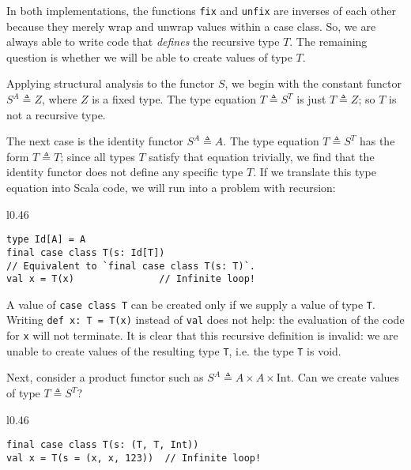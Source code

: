 In both implementations, the functions \lstinline!fix! and \lstinline!unfix!
are inverses of each other because they merely wrap and unwrap values
within a case class. So, we are always able to write code that \emph{defines}
the recursive type $T$. The remaining question is whether we will
be able to create values of type $T$.

Applying structural analysis to the functor $S$, we begin with the
constant functor $S^{A}\triangleq Z$, where $Z$ is a fixed type.
The type equation $T\triangleq S^{T}$ is just $T\triangleq Z$; so
$T$ is not a recursive type.

The next case is the identity functor $S^{A}\triangleq A$. The type
equation $T\triangleq S^{T}$ has the form $T\triangleq T$; since
all types $T$ satisfy that equation trivially, we find that the identity
functor does not define any specific type $T$. If we translate this
type equation into Scala code, we will run into a problem with recursion:

\begin{wrapfigure}{l}{0.46\columnwidth}%
\vspace{-1\baselineskip}
\begin{lstlisting}
type Id[A] = A
final case class T(s: Id[T])
// Equivalent to `final case class T(s: T)`.
val x = T(x)               // Infinite loop!
\end{lstlisting}

\vspace{-1.15\baselineskip}
\end{wrapfigure}%

\noindent A value of \lstinline!case class T! can be created only
if we supply a value of type \lstinline!T!. Writing \lstinline!def x: T = T(x)!
instead of \lstinline!val! does not help: the evaluation of the code
for \lstinline!x! will not terminate. It is clear that this recursive
definition is invalid: we are unable to create values of the resulting
type \lstinline!T!, i.e. the type \lstinline!T! is void.

Next, consider a product functor such as $S^{A}\triangleq A\times A\times\text{Int}$.
Can we create values of type $T\triangleq S^{T}$?

\begin{wrapfigure}{l}{0.46\columnwidth}%
\vspace{-0.8\baselineskip}
\begin{lstlisting}
final case class T(s: (T, T, Int))
val x = T(s = (x, x, 123))  // Infinite loop!
\end{lstlisting}

\vspace{-1\baselineskip}
\end{wrapfigure}%


